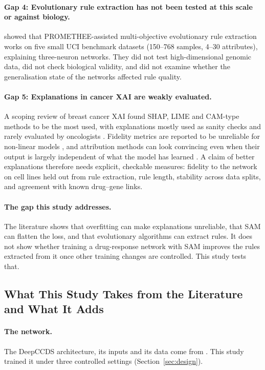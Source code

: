 \paragraph{Gap 4: Evolutionary rule extraction has not been tested at this scale or against biology.}
\citet{yedjour2024} showed that PROMETHEE-assisted multi-objective evolutionary rule extraction works on five small UCI benchmark datasets (150--768 samples, 4--30 attributes), explaining three-neuron networks. They did not test high-dimensional genomic data, did not check biological validity, and did not examine whether the generalisation state of the networks affected rule quality.

\paragraph{Gap 5: Explanations in cancer XAI are weakly evaluated.}
A scoping review of breast cancer XAI found SHAP, LIME and CAM-type methods to be the most used, with explanations mostly used as sanity checks and rarely evaluated by oncologists \citep{ghasemi2024}. Fidelity metrics are reported to be unreliable for non-linear models \citep{miro2025}, and attribution methods can look convincing even when their output is largely independent of what the model has learned \citep{adebayo2018}. A claim of better explanations therefore needs explicit, checkable measures: fidelity to the network on cell lines held out from rule extraction, rule length, stability across data splits, and agreement with known drug--gene links.

\paragraph{The gap this study addresses.}
The literature shows that overfitting can make explanations unreliable, that SAM can flatten the loss, and that evolutionary algorithms can extract rules. It does not show whether training a drug-response network with SAM improves the rules extracted from it once other training changes are controlled. This study tests that.

\subsection{What This Study Takes from the Literature and What It Adds}
\label{sec:adopts-adds}

\paragraph{The network.}
The DeepCCDS architecture, its inputs and its data come from \citet{wu2025}. This study trained it under three controlled settings (Section~\ref{sec:design}).

